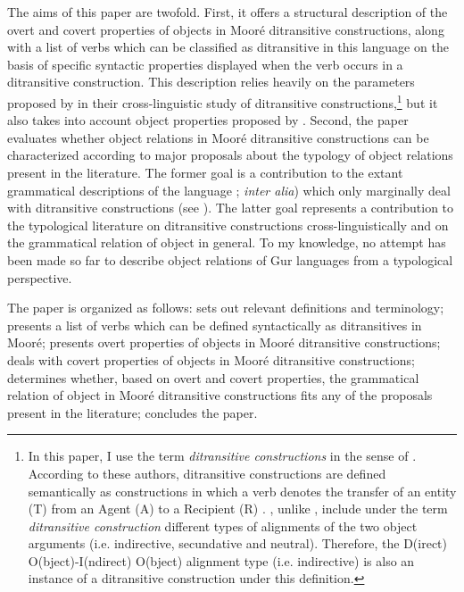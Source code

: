 \documentclass[output=paper]{langsci/langscibook}
\begin{document}
The aims of this paper are twofold. First, it offers a structural description of the overt and covert properties of objects in Mooré ditransitive constructions, along with a list of verbs which can be classified as ditransitive in this language on the basis of specific syntactic properties displayed when the verb occurs in a ditransitive construction. This description relies heavily on the parameters proposed by \citet{malchukovetal2010} in their cross-linguistic study of ditransitive constructions,\footnote{In this paper, I use the term \textit{ditransitive constructions} in the sense of \citet{malchukovetal2010}. According to these authors, ditransitive constructions are defined semantically as constructions in which a verb denotes the transfer of an entity (T) from an Agent (A) to a Recipient (R) \citep[1]{malchukovetal2010}. \citet{malchukovetal2010}, unlike \citet{goldberg1995}, include under the term \textit{ditransitive construction} different types of alignments of the two object arguments (i.e. indirective, secundative and neutral). Therefore, the D(irect) O(bject)-I(ndirect) O(bject) alignment type (i.e. indirective) is also an instance of a ditransitive construction under this definition.} but it also takes into account object properties proposed by \citet{hymanduranti1982}. Second, the paper evaluates whether object relations in Mooré ditransitive constructions can be characterized according to major proposals about the typology of object relations present in the literature. The former goal is a contribution to the extant grammatical descriptions of the language \citealt{alexandre1953,canu1974,peterson1971,kouraogo1976,kabore1985}; \textit{inter alia}) which only marginally deal with ditransitive constructions (see \citealt{canu1974,kabore1985}). The latter goal represents a contribution to the typological literature on ditransitive constructions cross-linguistically and on the grammatical relation of object in general. To my knowledge, no attempt has been made so far to describe object relations of Gur languages from a typological perspective.  

The paper is organized as follows:  sets out relevant definitions and terminology;  presents a list of verbs which can be defined syntactically as ditransitives in Mooré;  presents overt properties of objects in Mooré ditransitive constructions;  deals with covert properties of objects in Mooré ditransitive constructions;  determines whether, based on overt and covert properties, the grammatical relation of object in Mooré ditransitive constructions fits any of the proposals present in the literature;  concludes the paper.    
\end{document}
